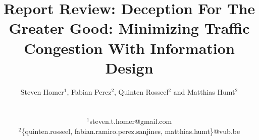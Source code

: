 \title{Report Review: Deception For The Greater Good: Minimizing Traffic Congestion With Information Design}
\author{Steven Homer$^1$, Fabian Perez$^2$, Quinten Rosseel$^2$ and Matthias Humt$^2$\\
\date{}
\mbox{}\\
$^1$steven.t.homer@gmail.com\\
$^2$\{quinten.rosseel, fabian.ramiro.perez.sanjines, matthias.humt\}@vub.be}
